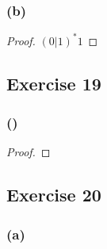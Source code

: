 \documentclass[14pt]{extarticle}
\begin{document}
\subsubsection{(b)}

\begin{proof}
\((0 | 1)^*1\)
\end{proof}

\subsection{Exercise 19}

\subsubsection{()}

\begin{proof}

\end{proof}

\subsection{Exercise 20}

\subsubsection{(a)}
\end{document}
